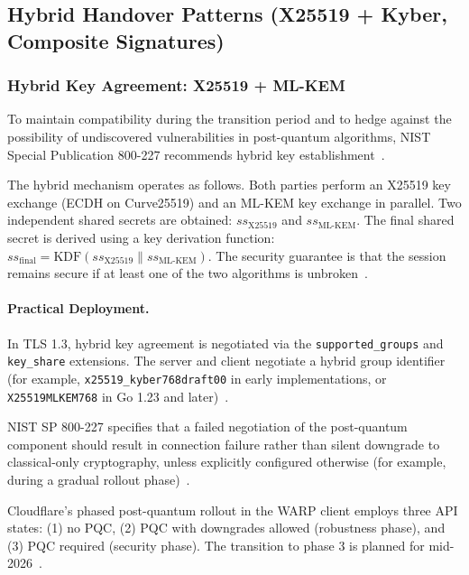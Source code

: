 \documentclass[12pt,a4paper]{article}
\begin{document}
\subsection{Hybrid Handover Patterns (X25519 + Kyber, Composite Signatures)}

\subsubsection{Hybrid Key Agreement: X25519 + ML-KEM}

To maintain compatibility during the transition period and to hedge against the possibility of undiscovered vulnerabilities in post-quantum algorithms, NIST Special Publication 800-227 recommends hybrid key establishment~\cite{nist-sp800-227-2024}.

The hybrid mechanism operates as follows. Both parties perform an X25519 key exchange (ECDH on Curve25519) and an ML-KEM key exchange in parallel. Two independent shared secrets are obtained: $\mathit{ss}_{\text{X25519}}$ and $\mathit{ss}_{\text{ML-KEM}}$. The final shared secret is derived using a key derivation function: $\mathit{ss}_{\text{final}} = \text{KDF}(\mathit{ss}_{\text{X25519}} \| \mathit{ss}_{\text{ML-KEM}})$. The security guarantee is that the session remains secure if at least one of the two algorithms is unbroken~\cite{nist-sp800-227-2024}.

\paragraph{Practical Deployment.}
In TLS 1.3, hybrid key agreement is negotiated via the \texttt{supported\_groups} and \texttt{key\_share} extensions. The server and client negotiate a hybrid group identifier (for example, \texttt{x25519\_kyber768draft00} in early implementations, or \texttt{X25519MLKEM768} in Go 1.23 and later)~\cite{cloudflare-warp-pqc-2025}.

NIST SP 800-227 specifies that a failed negotiation of the post-quantum component should result in connection failure rather than silent downgrade to classical-only cryptography, unless explicitly configured otherwise (for example, during a gradual rollout phase)~\cite{nist-sp800-227-2024}.

Cloudflare's phased post-quantum rollout in the WARP client employs three API states: (1) no PQC, (2) PQC with downgrades allowed (robustness phase), and (3) PQC required (security phase). The transition to phase 3 is planned for mid-2026~\cite{cloudflare-warp-pqc-2025}.
\end{document}
